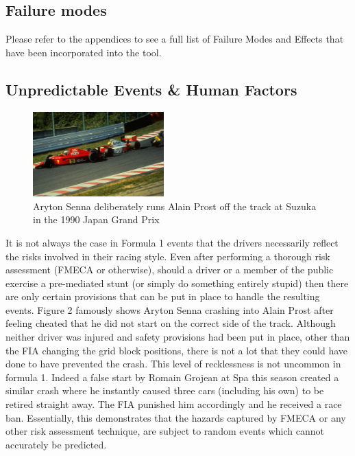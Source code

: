 \documentclass[12pt]{article} %
\begin{document}
\subsection{Failure modes}

Please refer to the appendices to see a full list of Failure Modes and Effects that have been incorporated into the tool.

\subsection{Unpredictable Events \& Human Factors} %


\begin{figure} %
  \begin{center}
    \includegraphics[width=0.45\textwidth]{senna-prost}
  \end{center}
\parbox{7cm}{\caption{Aryton Senna deliberately runs Alain Prost off the track at Suzuka in the 1990 Japan Grand Prix}}
\end{figure}

It is not always the case in Formula 1 events that the drivers necessarily reflect the risks involved in their racing style. Even after performing a thorough risk assessment (FMECA or otherwise), should a driver or a member of the public exercise a pre-mediated stunt (or simply do something entirely stupid) then there are only certain provisions that can be put in place to handle the resulting events. Figure 2 famously shows Aryton Senna crashing into Alain Prost after feeling cheated that he did not start on the correct side of the track. Although neither driver was injured and safety provisions had been put in place, other than the FIA changing the grid block positions, there is not a lot that they could have done to have prevented the crash. This level of recklessness is not uncommon in formula 1. Indeed a false start by Romain Grojean at Spa this season created a similar crash where he instantly caused three cars (including his own) to be retired straight away. The FIA punished him accordingly and he received a race ban. Essentially, this demonstrates that the hazards captured by FMECA or any other risk assessment technique, are subject to random events which cannot accurately be predicted.
\end{document}
